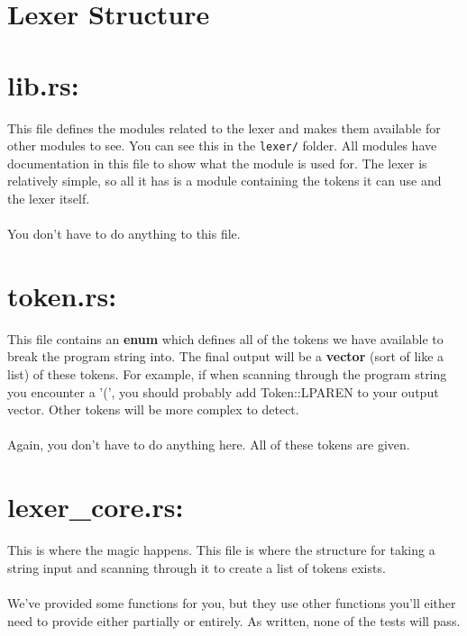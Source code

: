 \documentclass[
	12pt, %
]{fphw}
\newcommand{\code}[1]{%
  \lstinline[basicstyle=\footnotesize\ttfamily]$#1$%
}
\begin{document}
\pagebreak

\section*{Lexer Structure}




\section*{lib.rs:}
This file defines the modules related to the lexer and makes them available for other modules to see. You can see this in the \code{lexer/} folder. All modules have documentation in this file to show what the module is used for. The lexer is relatively simple, so all it has is a module containing the tokens it can use and the lexer itself.\\
\\
You don't have to do anything to this file.

\section*{token.rs:}
This file contains an \textbf{enum} which defines all of the tokens we have
available to break the program string into. The final output will be a
\textbf{vector} (sort of like a list) of these tokens. For example, if when
scanning through the program string you encounter a '(', you should probably add
Token::LPAREN to your output vector. Other tokens will be more complex to
detect.\\
\\
Again, you don't have to do anything here. All of these tokens are given.

\section*{lexer\_core.rs:}
This is where the magic happens. This file is where the structure for taking a string input and scanning through it to create a list of tokens exists. \\
\\
We've provided some functions for you, but they use other functions you'll
either need to provide either partially or entirely.  As written, none of the
tests will pass.
\end{document}
